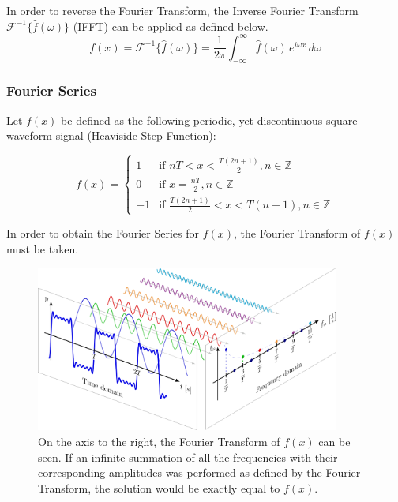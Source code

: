 
\begin{definition}
    In order to reverse the Fourier Transform, the Inverse Fourier Transform $\mathcal{F}^{-1}\{ \hat{f}(\omega) \}$ (IFFT) can be applied as defined below.
    \begin{equation} \label{eq:heaviside_step}
        f(x) = \mathcal{F}^{-1}\{ \hat{f}(\omega) \} = \frac{1}{2\pi} \int_{-\infty}^{\infty} \hat{f}(\omega) \, e^{i \omega x} \,d \omega
    \end{equation}
\end{definition}

\subsubsection{Fourier Series}
Let \(f(x)\) be defined as the following periodic, yet discontinuous square waveform signal (Heaviside Step Function):

\begin{equation}
f(x)=
    \begin{cases}
        1 & \text{if } nT < x < \frac{T(2n+1)}{2} , n \in \mathbb{Z}\\
        0 & \text{if } x = \frac{nT}{2} , n \in \mathbb{Z}\\
        -1 & \text{if } \frac{T(2n+1)}{2} < x < T(n+1) , n \in \mathbb{Z}
    \end{cases}
\end{equation}

In order to obtain the Fourier Series for \(f(x)\), the Fourier Transform of \(f(x)\) must be taken.

\begin{figure}[H]
    \centering
    \includegraphics[width=100mm,height=\textheight,keepaspectratio]{images/step_function_fourier_series.png}
    \caption{On the axis to the right, the Fourier Transform of \(f(x)\) can be seen. If an infinite summation of all the frequencies with their corresponding amplitudes was performed as defined by the Fourier Transform, the solution would be exactly equal to \(f(x)\).}
    \label{fig:decomposed_step_function}
\end{figure}

